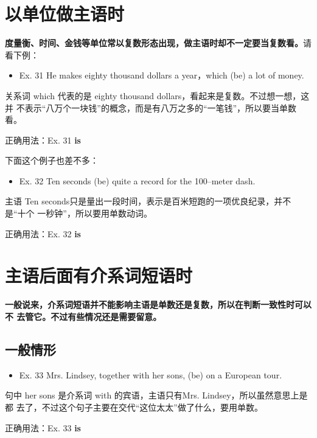 \documentclass{yufa}
\begin{document}
\section{以单位做主语时}

\textbf{度量衡、时间、金钱等单位常以复数形态出现，做主语时却不一定要当复数看。}请看下例：
\begin{mybox}
\begin{itemize}
\item   Ex. 31 He makes eighty thousand dollars a year，which (be) a lot of
  money.
\end{itemize}

关系词 which 代表的是 eighty thousand dollars，看起来是复数。不过想一想，这并
不表示“八万个一块钱”的概念，而是有八万之多的“一笔钱”，所以要当单数看。

\tcblower

正确用法：Ex. 31 \textbf{is}
\end{mybox}

下面这个例子也差不多：
\begin{mybox}

\begin{itemize}
\item   Ex. 32 Ten seconds (be) quite a record for the 100--meter dash.
\end{itemize}

主语 Ten seconds只是量出一段时间，表示是百米短跑的一项优良纪录，并不是“十个
一秒钟”，所以要用单数动词。

\tcblower

正确用法：Ex. 32 \textbf{is}
\end{mybox}

\section{主语后面有介系词短语时}

\textbf{一般说来，介系词短语并不能影响主语是单数还是复数，所以在判断一致性时可以不
  去管它。不过有些情况还是需要留意。}

\subsection{一般情形}

\begin{mybox}
\begin{itemize}
\item  Ex. 33 Mrs. Lindsey, together with her sons, (be) on a European tour.
\end{itemize}

句中 her sons 是介系词 with 的宾语，主语只有Mrs. Lindsey，所以虽然意思上是都
去了，不过这个句子主要在交代“这位太太”做了什么，要用单数。

\tcblower

正确用法：Ex. 33 \textbf{is}
\end{mybox}
\end{document}
